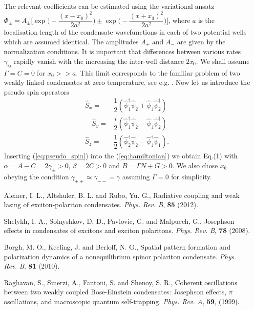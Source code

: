 \documentclass[10pt]{article}
\begin{document}
The relevant coefficients can be estimated using the variational ansatz $\Phi_{\pm} = A_{\pm} \Big[ \exp \Big( -\dfrac{(x - x_0)^2}{2 a^2} \Big) \pm \exp \Big( -\dfrac{(x + x_0)^2}{2 a^2} \Big) \Big]$, where $a$ is the localisation length of the condensate wavefunctions in each of two potential wells which are assumed identical.
The amplitudes $A_+$ and $A_-$ are given by the normalization conditions.
It is important that differences between various rates $\gamma_{ij}$ rapidly vanish with the increasing the inter-well distance $2x_0$.
We shall assume $\Gamma = C = 0$ for $x_0 >> a$.
This limit corresponds to the familiar problem of two weakly linked condensates at zero temperature, see e.g. \cite{Aleiner, Shelykh_2008, Borgh_2010, Raghavan}.
Now let us introduce the pseudo spin operators
%
\begin{subequations}
\begin{align}
\hat{S}_x = & \dfrac{1}{2} (\hat{\psi}_1^\dag \hat{\psi}_2 + \hat{\psi}_1 \hat{\psi}_2^\dag) \\
\quad \hat{S}_y = & \dfrac{i}{2} (\hat{\psi}_1^\dag \hat{\psi}_2 - \hat{\psi}_1 \hat{\psi}_2^\dag) \\
\hat{S}_z = & \dfrac{1}{2} (\hat{\psi}_2^\dag \hat{\psi}_2 - \hat{\psi}_1^\dag \hat{\psi}_1).
\end{align}
\label{eq:pseudo_spin}
\end{subequations}
%
Inserting (\ref{eq:pseudo_spin}) into the (\ref{eq:hamiltonian}) we obtain Eq.(1) with $\alpha = A - C = 2\gamma_{\pm} > 0$, $\beta = 2C > 0$ and $B = \Gamma N + G > 0$.
We also chose $x_0$ obeying the condition $\gamma_{++} \simeq \gamma_{--} = \gamma$ assuming $\Gamma = 0$ for simplicity.

\begin{thebibliography}{9}

Aleiner, I. L., Altshuler, B. L. and Rubo, Yu. G., Radiative coupling and weak lasing of exciton-polariton condensates. {\it Phys. Rev. B}, {\bf 85} (2012).

Shelykh, I. A., Solnyshkov, D. D., Pavlovic, G. and Malpuech, G., Josephson effects in condensates of excitons and exciton polaritons. {\it Phys. Rev. B}, {\bf 78} (2008).

Borgh, M. O., Keeling, J. and Berloff, N. G., Spatial pattern formation and polarization dynamics of a nonequilibrium spinor polariton condensate. {\it Phys. Rev. B}, {\bf 81} (2010).

Raghavan, S., Smerzi, A., Fantoni, S. and Shenoy, S. R., Coherent oscillations between two weakly coupled Bose-Einstein condensates: Josephson effects, $\pi$ oscillations, and macroscopic quantum self-trapping. {\it Phys. Rev. A}, {\bf 59}, (1999).

\end{thebibliography}
\end{document}
